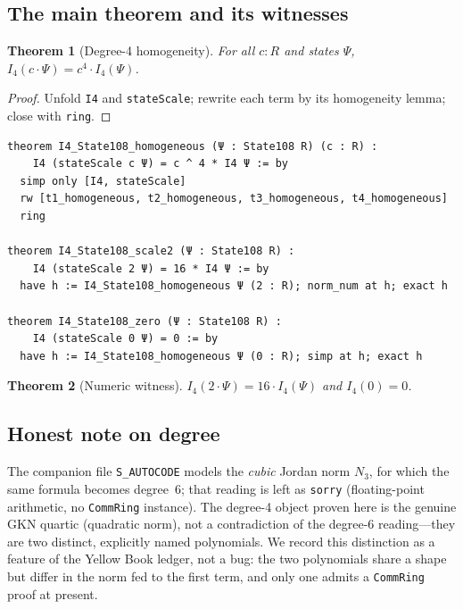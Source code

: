 \documentclass[11pt]{article}
\newtheorem{theorem}{Theorem}[section]
\theoremstyle{definition}
\newcommand{\Iq}{I_4}
\begin{document}
\subsection{The main theorem and its witnesses}
\label{sec:state108-main}

\begin{theorem}[Degree-4 homogeneity]\label{thm:state108}
For all $c:R$ and states $\Psi$,
$\Iq(c\cdot\Psi)=c^{4}\cdot\Iq(\Psi)$.
\end{theorem}
\begin{proof}
Unfold \texttt{I4} and \texttt{stateScale}; rewrite each term by its
homogeneity lemma; close with \texttt{ring}.
\end{proof}

\begin{lstlisting}[language=leanL,caption={Main theorem and numeric witnesses
  (GKN\_I4\_State108.lean).}]
theorem I4_State108_homogeneous (Ψ : State108 R) (c : R) :
    I4 (stateScale c Ψ) = c ^ 4 * I4 Ψ := by
  simp only [I4, stateScale]
  rw [t1_homogeneous, t2_homogeneous, t3_homogeneous, t4_homogeneous]
  ring

theorem I4_State108_scale2 (Ψ : State108 R) :
    I4 (stateScale 2 Ψ) = 16 * I4 Ψ := by
  have h := I4_State108_homogeneous Ψ (2 : R); norm_num at h; exact h

theorem I4_State108_zero (Ψ : State108 R) :
    I4 (stateScale 0 Ψ) = 0 := by
  have h := I4_State108_homogeneous Ψ (0 : R); simp at h; exact h
\end{lstlisting}

\begin{theorem}[Numeric witness]\label{thm:state108-2}
$\Iq(2\cdot\Psi)=16\cdot\Iq(\Psi)$ and $\Iq(0)=0$.
\end{theorem}

\subsection{Honest note on degree}
\label{sec:state108-note}

The companion file \texttt{S\_AUTOCODE} models the \emph{cubic} Jordan norm
$N_3$, for which the same formula becomes degree~6; that reading is left as
\texttt{sorry} (floating-point arithmetic, no \texttt{CommRing} instance). The
degree-4 object proven here is the genuine GKN quartic (quadratic norm), not a
contradiction of the degree-6 reading---they are two distinct, explicitly named
polynomials. We record this distinction as a feature of the Yellow Book ledger,
not a bug: the two polynomials share a shape but differ in the norm fed to the
first term, and only one admits a \texttt{CommRing} proof at present.
\end{document}
